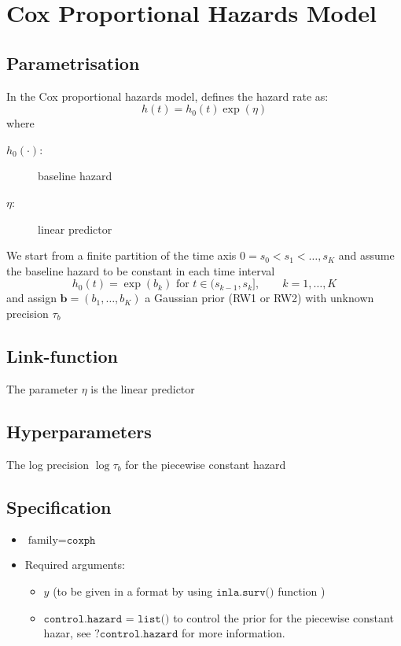\documentclass[a4paper,11pt]{article}
\begin{document}
\section*{Cox Proportional Hazards Model}

\subsection*{Parametrisation}

In the Cox proportional hazards model, defines the hazard rate as:
\begin{displaymath}
    h(t) = h_{0}(t)\exp(\eta)
\end{displaymath}
where
\begin{description}
\item[$h_{0}(\cdot)$:] baseline hazard
\item[$\eta$:] linear predictor
\end{description}

We start from a finite partition of the time axis
$0=s_{0}<s_{1}<\dots,s_{K}$ and assume the baseline hazard to be
constant in each time interval
\[
h_{0}(t) = \exp(b_{k})\mbox{ for }t\in(s_{k-1},s_{k}],\qquad
k=1,\dots,K
\]
and assign $\mathbf{b} = (b_{1},\dots,b_{K})$ a Gaussian prior (RW1 or
RW2) with unknown precision $\tau_{b}$
\subsection*{Link-function}

The parameter $\eta$ is the linear predictor

\subsection*{Hyperparameters}

The log precision $\log\tau_{b}$ for the piecewise constant hazard

\subsection*{Specification}

\begin{itemize}
\item $\text{family}=\texttt{coxph}$
\item Required arguments:
    \begin{itemize}
    \item $y$ (to be given in a format by using $\texttt{inla.surv()}$
        function )
    \item $\texttt{control.hazard = list()}$ to control the prior for
        the piecewise constant hazar, see $\texttt{?control.hazard}$
        for more information.
    \end{itemize}
\end{itemize}
\end{document}
